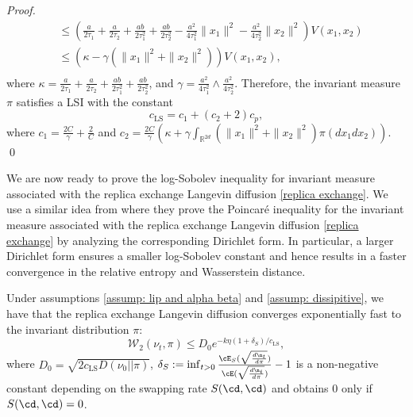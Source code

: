 \begin{proof}
\begin{equation}
\begin{split}
    &\leq \left(\frac{a}{2\tau_1}+\frac{a}{2\tau_2}+\frac{ab}{2\tau_1^2}+\frac{ab}{2\tau_2^2}-\frac{a^2}{4\tau_1^2}\|x_1\|^2-\frac{a^2}{4\tau_2^2}\|x_2\|^2\right) V(x_1, x_2)\\
    &\leq \left(\kappa-\gamma (\|x_1\|^2+\|x_2\|^2)\right) V(x_1, x_2),\\
\end{split}
\end{equation}
where $\kappa=\frac{a}{2\tau_1}+\frac{a}{2\tau_2}+\frac{ab}{2\tau_1^2}+\frac{ab}{2\tau_2^2}$, and $\gamma=\frac{a^2}{4\tau_1^2}\land \frac{a^2}{4\tau_2^2}$. Therefore, the invariant measure $\pi$ satisfies a LSI with the constant
\begin{equation}
    c_{\text{LS}}=c_1+(c_2+2)c_p,
\end{equation}
where $c_1=\frac{2C}{\gamma}+\frac{2}{C}$ and $c_2=\frac{2C}{\gamma}\left(\kappa+\gamma\int_{\mathbb{R}^{2d}}( \|x_1\|^2 + \|x_2\|^2)\pi(dx_1 dx_2)\right)$. \qed




\end{proof}{}



We are now ready to prove the log-Sobolev inequality for invariant measure associated with the replica exchange Langevin diffusion \eqref{replica exchange}. We use a similar idea from \citet{chen2018accelerating} where they prove the Poincar\'{e} inequality for the invariant measure associated with the replica exchange Langevin diffusion \eqref{replica exchange} by analyzing the corresponding Dirichlet form. In particular, a larger Dirichlet form ensures a smaller log-Sobolev constant and hence results in a faster convergence in the relative entropy and Wasserstein distance.

\begin{lemma}\label{exponential decay}
Under assumptions \eqref{assump: lip and alpha beta} and \eqref{assump: dissipitive}, we have that the replica exchange Langevin diffusion converges exponentially fast to the invariant distribution $\pi$:
\begin{equation}
    \mathcal{W}_2(\nu_t,\pi) \leq  D_0 e^{-k\eta(1+\delta_S)/c_{\text{LS}}},
\end{equation}
where $D_0=\sqrt{2c_{\text{LS}}D(\nu_0||\pi)}$, $\delta_{S}:=\inf_{t>0}\frac{\cE_S(\sqrt{\frac{d\n_t}{d\pi}})}{\cE(\sqrt{\frac{d\n_t}{d\pi}})}-1$ is a non-negative constant depending on the swapping rate $S(\cd, \cd)$ and obtains $0$ only if $S(\cd, \cd)=0$.
\end{lemma}{}

